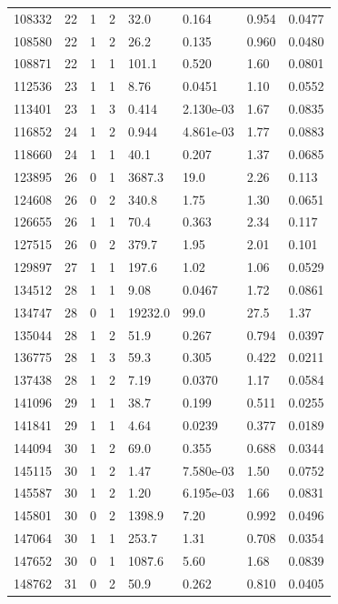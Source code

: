 \documentclass[preview]{standalone}
\begin{document}
{{{\begin{tabular}{L{1.2cm}C{1.2cm} C{0.3cm}C{0.5cm} C{1.4cm}C{1.4cm} C{1.4cm}C{1.4cm}}
  108332  &    22  & 1     &  2 &  32.0  & 0.164  & 0.954 &  0.0477   \\ 
  108580  &    22  & 1     &  2 &  26.2  & 0.135  & 0.960 &  0.0480   \\ 
  108871  &    22  & 1     &  1 &  101.1  & 0.520  & 1.60 &  0.0801   \\ 
  112536  &    23  & 1     &  1 &  8.76  & 0.0451  & 1.10 &  0.0552   \\ 
  113401  &    23  & 1     &  3 &  0.414  & 2.130e-03  & 1.67 &  0.0835   \\ 
  116852  &    24  & 1     &  2 &  0.944  & 4.861e-03  & 1.77 &  0.0883   \\ 
  118660  &    24  & 1     &  1 &  40.1  & 0.207  & 1.37 &  0.0685   \\ 
  123895  &    26  & 0     &  1 &  3687.3  & 19.0  & 2.26 &  0.113   \\ 
  124608  &    26  & 0     &  2 &  340.8  & 1.75  & 1.30 &  0.0651   \\ 
  126655  &    26  & 1     &  1 &  70.4  & 0.363  & 2.34 &  0.117   \\ 
  127515  &    26  & 0     &  2 &  379.7  & 1.95  & 2.01 &  0.101   \\ 
  129897  &    27  & 1     &  1 &  197.6  & 1.02  & 1.06 &  0.0529   \\ 
  134512  &    28  & 1     &  1 &  9.08  & 0.0467  & 1.72 &  0.0861   \\ 
  134747  &    28  & 0     &  1 &  19232.0  & 99.0  & 27.5 &  1.37   \\ 
  135044  &    28  & 1     &  2 &  51.9  & 0.267  & 0.794 &  0.0397   \\ 
  136775  &    28  & 1     &  3 &  59.3  & 0.305  & 0.422 &  0.0211   \\ 
  137438  &    28  & 1     &  2 &  7.19  & 0.0370  & 1.17 &  0.0584   \\ 
  141096  &    29  & 1     &  1 &  38.7  & 0.199  & 0.511 &  0.0255   \\ 
  141841  &    29  & 1     &  1 &  4.64  & 0.0239  & 0.377 &  0.0189   \\ 
  144094  &    30  & 1     &  2 &  69.0  & 0.355  & 0.688 &  0.0344   \\ 
  145115  &    30  & 1     &  2 &  1.47  & 7.580e-03  & 1.50 &  0.0752   \\ 
  145587  &    30  & 1     &  2 &  1.20  & 6.195e-03  & 1.66 &  0.0831   \\ 
  145801  &    30  & 0     &  2 &  1398.9  & 7.20  & 0.992 &  0.0496   \\ 
  147064  &    30  & 1     &  1 &  253.7  & 1.31  & 0.708 &  0.0354   \\ 
  147652  &    30  & 0     &  1 &  1087.6  & 5.60  & 1.68 &  0.0839   \\ 
  148762  &    31  & 0     &  2 &  50.9  & 0.262  & 0.810 &  0.0405   \\ 
\hline 
\end{tabular} 

}}}
\end{document}
